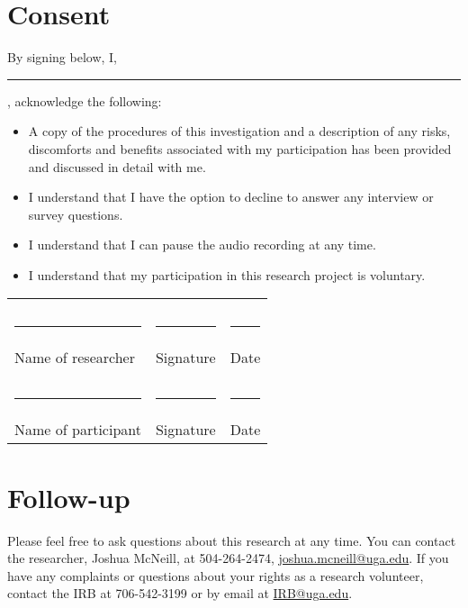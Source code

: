 \documentclass{article}
\begin{document}
    \section{Consent}
      By signing below, I, \rule{3cm}{0.4pt}, acknowledge the following:
      \begin{itemize}
        \item A copy of the procedures of this investigation and a description of any risks, discomforts and benefits associated with my participation has been provided and discussed in detail with me.
        \item I understand that I have the option to decline to answer any interview or survey questions.
        \item I understand that I can pause the audio recording at any time.
        \item I understand that my participation in this research project is voluntary.
      \end{itemize}

      \noindent\begin{tabular}{l l l}
                                       &                              & \\
                                       &                              & \\
        \rule{0.35\textwidth}{0.4pt}   & \rule{0.35\textwidth}{0.4pt} & \rule{0.2\textwidth}{0.4pt} \\
        Name of researcher             & Signature                    & Date \\
                                       &                              & \\
                                       &                              & \\
        \rule{0.35\textwidth}{0.4pt}   & \rule{0.35\textwidth}{0.4pt} & \rule{0.2\textwidth}{0.4pt} \\
        Name of participant            & Signature                    & Date \\
      \end{tabular}

    \section{Follow-up}
      Please feel free to ask questions about this research at any time.
      You can contact the researcher, Joshua McNeill, at 504-264-2474, \href{mailto:joshua.mcneill@uga.edu}{joshua.mcneill@uga.edu}.
      If you have any complaints or questions about your rights as a research volunteer, contact the IRB at 706-542-3199 or by email at \href{mailto:IRB@uga.edu}{IRB@uga.edu}.
  
\end{document}
